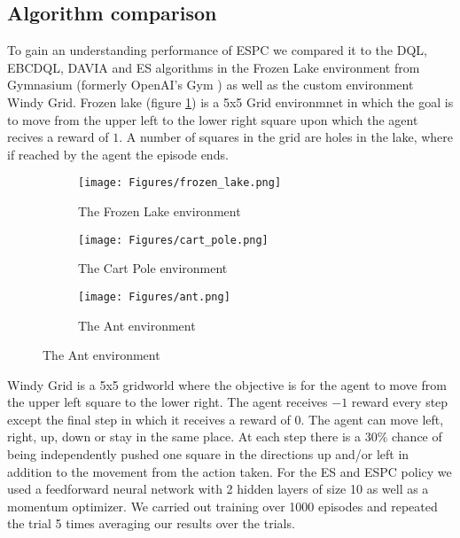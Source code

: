 \subsection{Algorithm comparison}
To gain an understanding performance of ESPC we compared it to the DQL, EBCDQL, DAVIA and ES algorithms in the Frozen Lake environment from Gymnasium (formerly OpenAI's Gym \cite{Gym}) as well as the custom environment Windy Grid. Frozen lake (figure \ref{fig:FrozenLake}) is a 5x5 Grid environmnet in which the goal is to move from the upper left to the lower right square upon which the agent recives a reward of $1$. A number of squares in the grid are holes in the lake, where if reached by the agent the episode ends. 

\begin{figure}
    \centering
    \begin{subfigure}{0.4\textwidth}
        \centering
        \texttt{[image: Figures/frozen\_lake.png]}
        \caption{The Frozen Lake environment}
        \label{fig:FrozenLake}
    \end{subfigure}
    \begin{subfigure}{0.4\textwidth}
        \centering
        \texttt{[image: Figures/cart\_pole.png]}
        \caption{The Cart Pole environment}
        \label{fig:CartPole}
    \end{subfigure}
    \begin{subfigure}{0.5\textwidth}
        \centering
        \texttt{[image: Figures/ant.png]}
        \caption{The Ant environment}
        \label{fig:Ant}
    \end{subfigure}
\end{figure}

Windy Grid is a 5x5 gridworld where the objective is for the agent to move from the upper left square to the lower right. The agent receives $-1$ reward every step except the final step in which it receives a reward of $0$. The agent can move left, right, up, down or stay in the same place. At each step there is a $30\%$ chance of being independently pushed one square in the directions up and/or left in addition to the movement from the action taken. For the ES and ESPC policy we used a feedforward neural network with 2 hidden layers of size 10 as well as a momentum optimizer.
We carried out training over 1000 episodes and repeated the trial 5 times averaging our results over the trials. 

